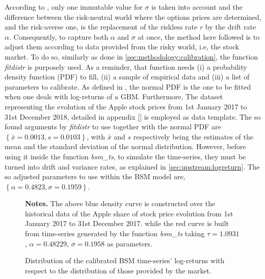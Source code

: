 \documentclass[a4paper, 12pt]{report}
\begin{document}
According to \citet{bs}, only one immutable value for $\sigma$ is taken into account and the difference between the risk-neutral world where the options prices are determined, and the risk-averse one, is the replacement of the riskless rate $r$ by the drift rate $\alpha$.
Consequently, to capture both $\alpha$ and $\sigma$ at once, the method here followed is to adjust them according to data provided from the risky world, i.e, the stock market.
To do so, similarly as done in \cref{sec:methodology:calibration}, the function \textit{fitdistr} is purposely used.
As a reminder, that function needs (i) a probability density function (PDF) to fill, (ii) a sample of empirical data and (iii) a list of parameters to calibrate.
As defined in \citet{bs}, the normal  PDF is the one to be fitted when one deals with log-returns of a GBM.
Furthermore, The dataset representing the evolution of the Apple stock prices from 1st January 2017 to 31st December 2018, detailed in appendix \cref{} is employed as data template.
The so found arguments by \textit{fitdistr} to use together with the normal PDF are $\left\{ \bar{x} = 0.0013, s = 0.0103 \right\}$, with $\bar{x}$ and $s$ respectively being the estimates of the mean and the standard deviation of the normal distribution.
However, before using it inside the function \textit{bsm\_ts}, to simulate the time-series, they must be turned into drift and variance rates, as explained in \cref{sec:upstream:logreturn}.
The so adjusted parameters to use within the BSM model are, $\left\{ \alpha = 0.4823, \sigma = 0.1959  \right\}$.

\begin{figure}[h]
  \centering
  
  \caption{Distribution of the calibrated BSM time-series' log-returns with respect to the distribution of those provided by the market.}
  \begin{changemargin}{0.5cm}{0.5cm}
  \medskip
\footnotesize
{}\textbf{Notes.} The above blue density curve is constructed over the historical data of the Apple share of stock price evolution from 1st January 2017 to 31st December 2017. while the red curve is built from time-series generated by the function \textit{bsm\_ts} taking $\tau = 1.0931$, $\alpha = 0.48229$, $\sigma = 0.1958$ as parameters.
  \end{changemargin}
  \label{p:analysis:gbm:adjusted}
\end{figure}
\end{document}
